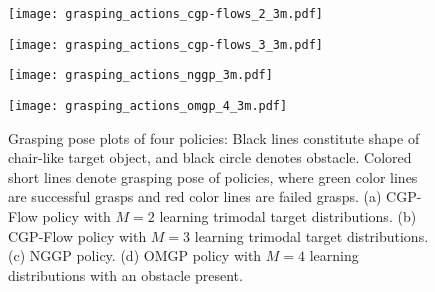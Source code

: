 \documentclass[sn-mathphys-num]{sn-jnl}
\begin{document}
\begin{figure}[t]
    \centering
    \begin{minipage}[t]{0.49\linewidth}
        \centering
        \texttt{[image: grasping\_actions\_cgp-flows\_2\_3m.pdf]}
        \vspace{-2mm}
        \label{fig:grasping:distribution:a}
    \end{minipage}%
    \begin{minipage}[t]{0.49\linewidth}
        \centering
        \texttt{[image: grasping\_actions\_cgp-flows\_3\_3m.pdf]}
        \vspace{-2mm}
       \label{fig:grasping:distribution:b}
    \end{minipage}
    \begin{minipage}[t]{0.49\linewidth}
        \centering
        \texttt{[image: grasping\_actions\_nggp\_3m.pdf]}
        \vspace{-2mm}
        \label{fig:grasping:distribution:c}
    \end{minipage}
    \begin{minipage}[t]{0.49\linewidth}
        \centering
        \texttt{[image: grasping\_actions\_omgp\_4\_3m.pdf]}
        \vspace{-2mm}
        \label{fig:grasping:distribution:d}
    \end{minipage}
    \caption{
    Grasping pose plots of four policies: Black lines constitute shape of chair-like target object, and black circle denotes obstacle. Colored short lines denote grasping pose of policies, where green color lines are successful grasps and red color lines are failed grasps.
    (a) CGP-Flow policy with $M=2$ learning trimodal target distributions.
    (b) CGP-Flow policy with $M=3$ learning trimodal target distributions.
    (c) NGGP policy.
    (d) OMGP policy with $M=4$ learning distributions with an obstacle present.
    }
    \label{fig:grasping:distribution}
\end{figure}
\end{document}
